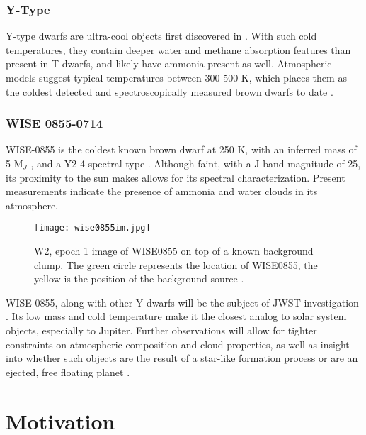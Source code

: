 \subsubsection{Y-Type}
Y-type dwarfs are ultra-cool objects first discovered in \parencite{Cushing2011}. 
With such cold temperatures, they contain deeper water and methane absorption features than present in T-dwarfs, and likely have ammonia present as well.
Atmospheric models suggest typical temperatures between 300-500 K, which places them as the coldest detected and spectroscopically measured brown dwarfs to date \parencite{Cushing2011}.

\subsubsection{WISE 0855-0714}
WISE-0855 is the coldest known brown dwarf at 250 K, with an inferred mass of 5 M$_{J}$ \parencite{Luhman2014}, and a Y2-4 spectral type \parencite{Leggett2015}.
Although faint, with a J-band magnitude of 25, its proximity to the sun makes allows for its spectral characterization.
Present measurements indicate the presence of ammonia \parencite{Leggett2015} and water clouds \parencite{Morley2014,Faherty2018} in its atmosphere.

\begin{wrapfigure}{r}{5.5cm}
	\centering
	\vspace{-1em}
	\texttt{[image: wise0855im.jpg]}
	\caption{W2, epoch 1 image of WISE0855 on top of a known background clump. The green circle represents the location of WISE0855, the yellow is the position of the background source \parencite{Wright2014}. }
	\label{fig:wise0855im}
	\vspace{-6em}
\end{wrapfigure} 
WISE 0855, along with other Y-dwarfs will be the subject of JWST investigation \parencite{Oliveira2015,Oliveira2019}.
Its low mass and cold temperature make it the closest analog to solar system objects, especially to Jupiter. 
Further observations will allow for tighter constraints on atmospheric composition and cloud properties, as well as insight into whether such objects are the result of a star-like formation process or are an ejected, free floating planet \parencite{Beichman2014}.
\section{Motivation}
